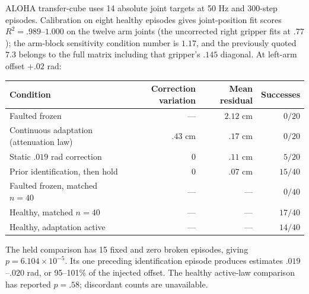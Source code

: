 ALOHA transfer-cube uses 14 absolute joint targets at 50 Hz and 300-step episodes.
Calibration on eight healthy episodes gives joint-position fit scores
$R^2=.989$--$1.000$ on the twelve arm joints (the uncorrected right gripper
fits at $.77$); the arm-block sensitivity condition number is $1.17$, and
the previously quoted $7.3$ belongs to the full matrix including that
gripper's $.145$ diagonal. At left-arm offset
$+.02$ rad:
\begin{center}\small
\begin{tabular}{lrrr}
\toprule
Condition & Correction variation & Mean residual & Successes\\
\midrule
Faulted frozen & --- & $2.12$ cm & $0/20$\\
Continuous adaptation (attenuation law) & $.43$ cm & $.17$ cm & $0/20$\\
Static $.019$ rad correction & $0$ & $.11$ cm & $5/20$\\
Prior identification, then hold & $0$ & $.07$ cm & $15/40$\\
Faulted frozen, matched $n=40$ & --- & --- & $0/40$\\
Healthy, matched $n=40$ & --- & --- & $17/40$\\
Healthy, adaptation active & --- & --- & $14/40$\\
\bottomrule
\end{tabular}
\end{center}
The held comparison has 15 fixed and zero broken episodes, giving
$p=6.104\times10^{-5}$. Its one preceding identification episode produces estimates
$.019$--$.020$ rad, or 95--101\% of the injected offset. The healthy active-law
comparison has reported $p=.58$; discordant counts are unavailable.

